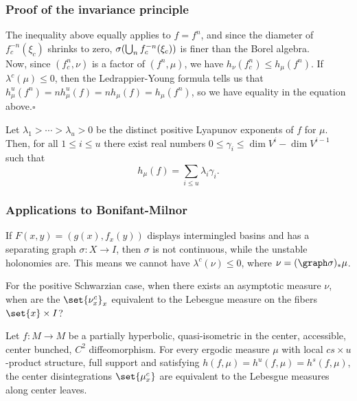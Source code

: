 \documentclass[shortlabels, 9pt, aspectratio=2013]{beamer}
\begin{document}
\begin{frame}
  \frametitle{Proof of the invariance principle}
  \begin{proofs}
    The inequality above equally applies to \(f = f^n\), and since the diameter of \(f_c^{-n}(\xi_c)\) shrinks to zero, \(\sigma\rpar*{\bigcup_nf_c^{-n}(\xi_c)}\) is finer than the Borel algebra.\\[1em]

    Now, since \((f^n_c, \nu)\) is a factor of \((f^n,\mu)\), we have \(h_{\nu}(f_c^n) \le h_{\mu}(f^n)\). If \(\lambda^c(\mu) \le 0\), then the Ledrappier-Young formula tells us that \(h_{\mu}^u(f^n) = n h_{\mu}^u(f) = n h_{\mu}(f) = h_{\mu}(f^n)\), so we have equality in the equation above.\hfill$\square$
  \end{proofs}
  \begin{theorem}\label{thm:leddrappier-young}
    Let \(\lambda_1 > \cdots > \lambda_u > 0\) be the distinct positive Lyapunov exponents of \(f\) for \(\mu\). Then, for all \(1 \le i \le u\) there exist real numbers \(0 \le \gamma_i \le \dim V^i - \dim V^{i - 1}\) such that
    \begin{equation*}
      h_{\mu}(f) = \sum_{i \le u} \lambda_i\gamma_i.
    \end{equation*}
  \end{theorem}
  
\end{frame}

\begin{frame}
  \frametitle{Applications to Bonifant-Milnor}
  \begin{corollary}
    If \(F(x,y) = (g(x),f_x(y))\) displays intermingled basins and has a separating graph \(\sigma \colon X \to I\), then \(\sigma\) is not continuous, while the unstable holonomies are. This means we cannot have \(\lambda^c(\nu)\le 0\), where \(\nu = (\graph \sigma)_*\mu\).
  \end{corollary}
  \begin{question}
    For the positive Schwarzian case, when there exists an asymptotic measure \(\nu\), when are the \(\set{\nu_x^c}_x\) equivalent to the Lebesgue measure on the fibers \(\set{x} \times I\)?
  \end{question}
  \begin{proposition}
    Let \(f \colon M \to M\) be a partially hyperbolic, quasi-isometric in the center, accessible, center bunched, \(C^2\) diffeomorphism. For every ergodic measure \(\mu\) with local \(cs \times u\)-product structure, full support and satisfying \(h(f,\mu) = h^u(f,\mu) = h^s(f,\mu)\), the center disintegrations \(\set{\mu^c_x}\) are equivalent to the Lebesgue measures along center leaves.
  \end{proposition}
\end{frame}
\end{document}
